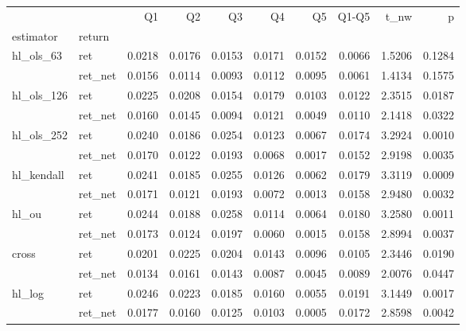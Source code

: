 \begin{tabular}{llrrrrrrrr}
\toprule
 &  & Q1 & Q2 & Q3 & Q4 & Q5 & Q1-Q5 & t_nw & p \\
estimator & return &  &  &  &  &  &  &  &  \\
\midrule
\multirow[t]{2}{*}{hl_ols_63} & ret & 0.0218 & 0.0176 & 0.0153 & 0.0171 & 0.0152 & 0.0066 & 1.5206 & 0.1284 \\
 & ret_net & 0.0156 & 0.0114 & 0.0093 & 0.0112 & 0.0095 & 0.0061 & 1.4134 & 0.1575 \\
\cline{1-10}
\multirow[t]{2}{*}{hl_ols_126} & ret & 0.0225 & 0.0208 & 0.0154 & 0.0179 & 0.0103 & 0.0122 & 2.3515 & 0.0187 \\
 & ret_net & 0.0160 & 0.0145 & 0.0094 & 0.0121 & 0.0049 & 0.0110 & 2.1418 & 0.0322 \\
\cline{1-10}
\multirow[t]{2}{*}{hl_ols_252} & ret & 0.0240 & 0.0186 & 0.0254 & 0.0123 & 0.0067 & 0.0174 & 3.2924 & 0.0010 \\
 & ret_net & 0.0170 & 0.0122 & 0.0193 & 0.0068 & 0.0017 & 0.0152 & 2.9198 & 0.0035 \\
\cline{1-10}
\multirow[t]{2}{*}{hl_kendall} & ret & 0.0241 & 0.0185 & 0.0255 & 0.0126 & 0.0062 & 0.0179 & 3.3119 & 0.0009 \\
 & ret_net & 0.0171 & 0.0121 & 0.0193 & 0.0072 & 0.0013 & 0.0158 & 2.9480 & 0.0032 \\
\cline{1-10}
\multirow[t]{2}{*}{hl_ou} & ret & 0.0244 & 0.0188 & 0.0258 & 0.0114 & 0.0064 & 0.0180 & 3.2580 & 0.0011 \\
 & ret_net & 0.0173 & 0.0124 & 0.0197 & 0.0060 & 0.0015 & 0.0158 & 2.8994 & 0.0037 \\
\cline{1-10}
\multirow[t]{2}{*}{cross} & ret & 0.0201 & 0.0225 & 0.0204 & 0.0143 & 0.0096 & 0.0105 & 2.3446 & 0.0190 \\
 & ret_net & 0.0134 & 0.0161 & 0.0143 & 0.0087 & 0.0045 & 0.0089 & 2.0076 & 0.0447 \\
\cline{1-10}
\multirow[t]{2}{*}{hl_log} & ret & 0.0246 & 0.0223 & 0.0185 & 0.0160 & 0.0055 & 0.0191 & 3.1449 & 0.0017 \\
 & ret_net & 0.0177 & 0.0160 & 0.0125 & 0.0103 & 0.0005 & 0.0172 & 2.8598 & 0.0042 \\
\cline{1-10}
\bottomrule
\end{tabular}
